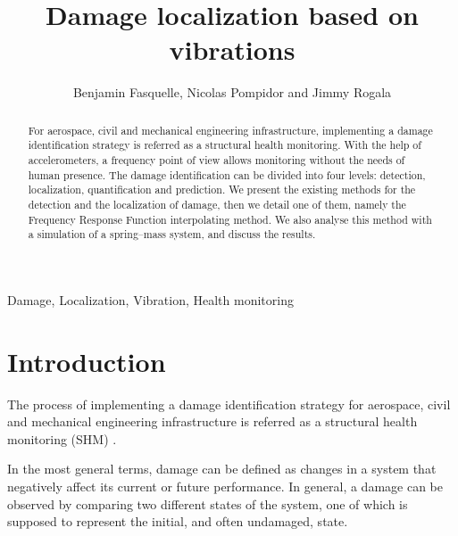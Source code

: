 \documentclass[journal]{IEEEtran}
\begin{document}
%
\title{Damage localization based on vibrations}


\author{Benjamin Fasquelle, Nicolas Pompidor and Jimmy Rogala}

\newtheorem{remark}{Remark}



\maketitle


\begin{abstract}
For aerospace, civil and mechanical engineering infrastructure, implementing a damage identification strategy is referred as a structural health monitoring.
With the help of accelerometers, a frequency point of view allows monitoring without the needs of human presence.
The damage identification can be divided into four levels: detection, localization, quantification and prediction.
We present the existing methods for the detection and the localization of damage, then we detail one of them, namely the Frequency Response Function interpolating method.
We also analyse this method with a simulation of a spring–mass system, and discuss the results.



\end{abstract}

\begin{IEEEkeywords}
Damage, Localization, Vibration, Health monitoring
\end{IEEEkeywords}


\IEEEpeerreviewmaketitle



\section{Introduction}


The process of implementing a damage identification strategy for aerospace,
 civil and mechanical engineering infrastructure is referred as a structural health monitoring (SHM) \cite{farrar2007introduction}.

In the most general terms, damage can be defined as changes in a system that negatively affect its current or future performance. 
In general, a damage can be observed by comparing two different states of the system,
 one of which is supposed to represent the initial, and often undamaged, state.
\end{document}
